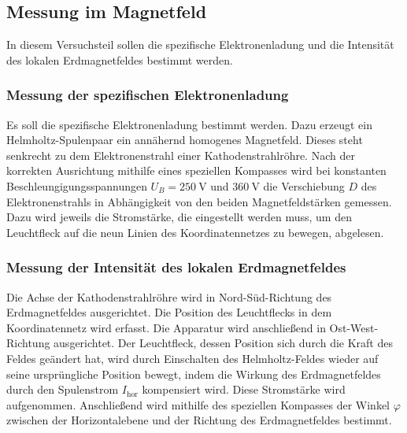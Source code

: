 \subsection{Messung im Magnetfeld}
In diesem Versuchsteil sollen die spezifische Elektronenladung
und die Intensität des lokalen Erdmagnetfeldes bestimmt werden.

\subsubsection{Messung der spezifischen Elektronenladung}
Es soll die spezifische Elektronenladung bestimmt werden.
Dazu erzeugt ein Helmholtz-Spulenpaar ein annähernd homogenes
Magnetfeld. Dieses steht senkrecht zu dem Elektronenstrahl
einer Kathodenstrahlröhre.
Nach der korrekten Ausrichtung mithilfe eines speziellen
Kompasses wird bei konstanten
Beschleungigungsspannungen $U_B = \SI{250}{\volt}$ und 
$\SI{360}{\volt}$ die Verschiebung $D$ des Elektronenstrahls
in Abhängigkeit von den beiden Magnetfeldstärken gemessen. 
Dazu wird jeweils die
Stromstärke, die eingestellt werden muss, um den Leuchtfleck
auf die neun Linien des Koordinatennetzes zu bewegen,
abgelesen.

\subsubsection{Messung der Intensität des lokalen Erdmagnetfeldes}
Die Achse der Kathodenstrahlröhre wird in Nord-Süd-Richtung
des Erdmagnetfeldes ausgerichtet. Die Position des Leuchtflecks 
in dem Koordinatennetz wird erfasst.
Die Apparatur wird anschließend in Ost-West-Richtung ausgerichtet.
Der Leuchtfleck, dessen Position sich durch die Kraft des
Feldes geändert hat, wird durch Einschalten des Helmholtz-Feldes
wieder auf seine ursprüngliche Position bewegt, indem die Wirkung
des Erdmagnetfeldes durch den Spulenstrom $I_\text{hor}$ kompensiert
wird. Diese Stromstärke wird aufgenommen.
Anschließend wird mithilfe des speziellen Kompasses der Winkel
$\varphi$ zwischen der Horizontalebene und der Richtung des
Erdmagnetfeldes bestimmt.

